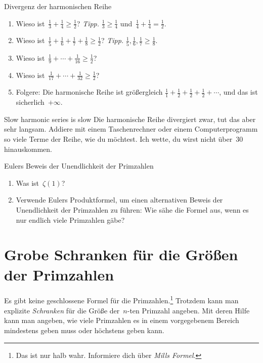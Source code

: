 \documentclass[twoside]{../zirkelblatt1415}
\theoremstyle{definition}
\theoremstyle{plain}
\theoremstyle{remark}
\begin{document}
\begin{aufgabe}{Divergenz der harmonischen Reihe}
\begin{enumerate}
\item Wieso ist~$\frac{1}{3} + \frac{1}{4} \geq \frac{1}{2}$?
\tabto{6cm}
\emph{Tipp.} $\frac{1}{3} \geq \frac{1}{4}$ und~$\frac{1}{4} + \frac{1}{4} =
\frac{1}{2}$.
\item Wieso ist~$\frac{1}{5} + \frac{1}{6} + \frac{1}{7} + \frac{1}{8} \geq \frac{1}{2}$?
\tabto{6cm}
\emph{Tipp.} $\frac{1}{5}, \frac{1}{6}, \frac{1}{7} \geq \frac{1}{8}$.

\item Wieso ist~$\frac{1}{9} + \cdots + \frac{1}{16} \geq \frac{1}{2}$?

\item Wieso ist~$\frac{1}{17} + \cdots + \frac{1}{32} \geq \frac{1}{2}$?

\item Folgere: Die harmonische Reihe ist größergleich
$\frac{1}{1} + \frac{1}{2} + \frac{1}{2} + \frac{1}{2} + \cdots$,
und das ist sicherlich~$+\infty$.
\end{enumerate}\fixlistspacing
\end{aufgabe}

\begin{aufgabe}{Slow harmonic series is slow}
Die harmonische Reihe divergiert zwar, tut das aber sehr langsam. Addiere mit
einem Taschenrechner oder einem Computerprogramm so viele Terme der Reihe, wie
du möchtest. Ich wette, du wirst nicht über~$30$ hinauskommen.
\end{aufgabe}

\begin{aufgabe}{Eulers Beweis der Unendlichkeit der Primzahlen}
\begin{enumerate}
\item Was ist~$\zeta(1)$?
\item Verwende Eulers Produktformel, um einen alternativen Beweis der
Unendlichkeit der Primzahlen zu führen: Wie sähe die Formel aus, wenn es nur
endlich viele Primzahlen gäbe?
\end{enumerate}\fixlistspacing
\end{aufgabe}


\section{Grobe Schranken für die Größen der Primzahlen}

Es gibt keine geschlossene Formel für die Primzahlen.\footnote{Das ist nur halb
wahr. Informiere dich über \emph{Mills Formel}.} Trotzdem kann man explizite
\emph{Schranken} für die Größe der~$n$-ten Primzahl angeben. Mit deren Hilfe
kann man angeben, wie viele Primzahlen es in einem vorgegebenem Bereich
mindestens geben muss oder höchstens geben kann.
\end{document}
